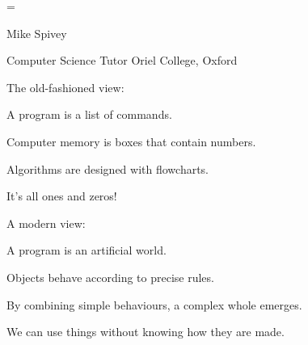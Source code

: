 

\newdimen\rmargin \rmargin=\fontquad
\def\demo{\vskip\parskip\begingroup
  \catcode`\$=12 \catcode`\&=12 \afterassignment\ddemo\count255=}
\def\ddemo#1{\line{\setbox0=\hbox{\epsfbox{pics/talk2-\the\count255.eps}}%
  \vbox to\ht0{\vss\hbox{\strut\vsf #1}\vss}\hfil\box0\hskip\rmargin}
  \endgroup}


\blankslide

{\grid\twentysfb
\incolour{}\par}
\vfill
{\twelvepoint\sf\noindent
Mike Spivey\par
\noindent
\sfi Computer Science Tutor\hfil\break
Oriel College, Oxford}









The old-fashioned view:

\item A program is a list of commands.
\item Computer memory is boxes that contain numbers.
\item Algorithms are designed with flowcharts.
\item It's all ones and zeros!


A modern view:

\item A program is an artificial world.
\item Objects behave according to precise rules.
\item By combining simple behaviours, a complex whole emerges.
\item We can use things without knowing how they are made.

